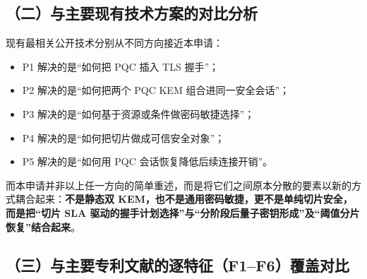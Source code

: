 \documentclass[12pt,a4paper]{article}
\begin{document}
\subsection*{（二）与主要现有技术方案的对比分析}

现有最相关公开技术分别从不同方向接近本申请：

\begin{itemize}[leftmargin=2em]
    \item P1 解决的是“如何把 PQC 插入 TLS 握手”；
    \item P2 解决的是“如何把两个 PQC KEM 组合进同一安全会话”；
    \item P3 解决的是“如何基于资源或条件做密码敏捷选择”；
    \item P4 解决的是“如何把切片做成可信安全对象”；
    \item P5 解决的是“如何用 PQC 会话恢复降低后续连接开销”。
\end{itemize}

而本申请并非以上任一方向的简单重述，而是将它们之间原本分散的要素以新的方式耦合起来：\textbf{不是静态双 KEM，也不是通用密码敏捷，更不是单纯切片安全，而是把“切片 SLA 驱动的握手计划选择”与“分阶段后量子密钥形成”及“阈值分片恢复”结合起来}。

\subsection*{（三）与主要专利文献的逐特征（F1--F6）覆盖对比}
\end{document}
